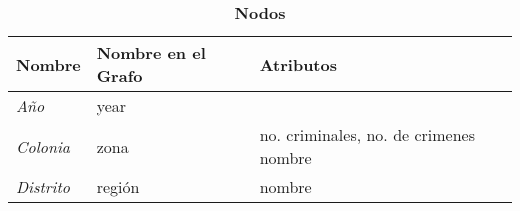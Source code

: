 \def\arraystretch{1.5} %
\begin{table}[H]
\centering
\caption{\textbf{Nodos}}
\footnotesize
\centering
\begin{tabular}{p{1.3cm} p{2.6cm} p{3.5cm}}
\textbf{Nombre} &  \textbf{Nombre en el Grafo} & \textbf{Atributos}\\
\hline
\hline 
\textit{A\~no} & year &\\
\textit{Colonia} & zona & no. criminales, no. de crimenes nombre\\
\textit{Distrito} & regi\'on & nombre
\end{tabular}
\label{tab:t_nodos}
\end{table}
